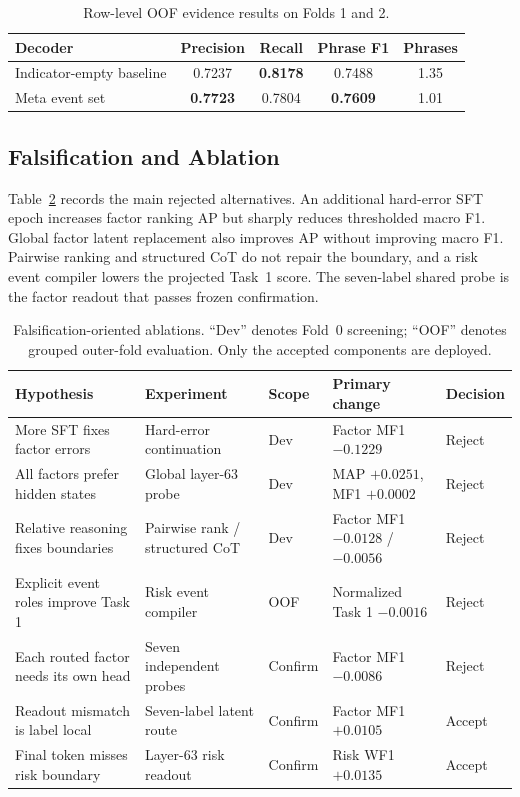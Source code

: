 \documentclass[conference]{IEEEtran}
\begin{document}
\begin{table}[t]
\caption{Row-level OOF evidence results on Folds 1 and 2.}
\label{tab:evidence}
\centering
\begin{tabular}{lcccc}
\toprule
Decoder & Precision & Recall & Phrase F1 & Phrases \\
\midrule
Indicator-empty baseline & 0.7237 & \textbf{0.8178} & 0.7488 & 1.35 \\
Meta event set & \textbf{0.7723} & 0.7804 & \textbf{0.7609} & 1.01 \\
\bottomrule
\end{tabular}
\end{table}

\subsection{Falsification and Ablation}
Table~\ref{tab:falsification} records the main rejected alternatives. An additional hard-error SFT epoch increases factor ranking AP but sharply reduces thresholded macro F1. Global factor latent replacement also improves AP without improving macro F1. Pairwise ranking and structured CoT do not repair the boundary, and a risk event compiler lowers the projected Task~1 score. The seven-label shared probe is the factor readout that passes frozen confirmation.

\begin{table}[t]
\caption{Falsification-oriented ablations. ``Dev'' denotes Fold~0 screening; ``OOF'' denotes grouped outer-fold evaluation. Only the accepted components are deployed.}
\label{tab:falsification}
\centering
\begin{tabular}{lllll}
\toprule
Hypothesis & Experiment & Scope & Primary change & Decision \\
\midrule
More SFT fixes factor errors & Hard-error continuation & Dev & Factor MF1 $-0.1229$ & Reject \\
All factors prefer hidden states & Global layer-63 probe & Dev & MAP $+0.0251$, MF1 $+0.0002$ & Reject \\
Relative reasoning fixes boundaries & Pairwise rank / structured CoT & Dev & Factor MF1 $-0.0128$ / $-0.0056$ & Reject \\
Explicit event roles improve Task 1 & Risk event compiler & OOF & Normalized Task 1 $-0.0016$ & Reject \\
Each routed factor needs its own head & Seven independent probes & Confirm & Factor MF1 $-0.0086$ & Reject \\
Readout mismatch is label local & Seven-label latent route & Confirm & Factor MF1 $+0.0105$ & Accept \\
Final token misses risk boundary & Layer-63 risk readout & Confirm & Risk WF1 $+0.0135$ & Accept \\
\bottomrule
\end{tabular}
\end{table}
\end{document}
